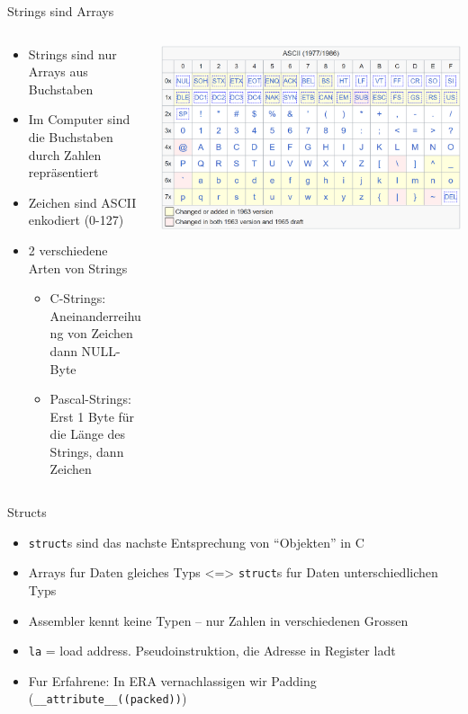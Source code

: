 \documentclass[
  german,            %
  aspectratio=169,    %
]{tumbeamer}
\begin{document}
\begin{frame}[c]{Strings sind Arrays}{}
  \begin{columns}[c]
    \begin{column}{0.5\textwidth}
      \begin{itemize}
        \item Strings sind nur Arrays aus Buchstaben
        \item Im Computer sind die Buchstaben durch Zahlen repräsentiert
        \item Zeichen sind ASCII enkodiert (0-127)
        \item 2 verschiedene Arten von Strings
        \begin{itemize}
          \item C-Strings: Aneinanderreihung von Zeichen dann NULL-Byte
          \item Pascal-Strings: Erst 1 Byte für die Länge des Strings, dann Zeichen
        \end{itemize}
      \end{itemize}
    \end{column}
    \begin{column}{0.5\textwidth}
      \includegraphics[width=\linewidth]{ascii.png}
    \end{column}
  \end{columns}
\end{frame}

\begin{frame}[c]{Structs}{}
  \begin{itemize}
    \item \texttt{struct}s sind das nachste Entsprechung von \enquote{Objekten} in C
    \item Arrays fur Daten gleiches Typs <=> \texttt{struct}s fur Daten unterschiedlichen Typs 
    \item Assembler kennt keine Typen -- nur Zahlen in verschiedenen Grossen
    \item \texttt{la} = load address. Pseudoinstruktion, die Adresse in Register ladt
    \item Fur Erfahrene: In ERA vernachlassigen wir Padding (\texttt{\_\_attribute\_\_((packed))})
  \end{itemize}
\end{frame} 
\end{document}

